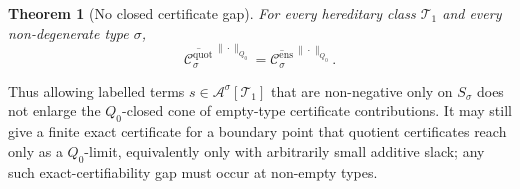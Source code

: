 \documentclass[11pt]{article}
\newtheorem{theorem}{Theorem}
\theoremstyle{definition}
\newcommand{\A}{\mathcal{A}}
\newcommand{\T}{\mathcal{T}}
\newcommand{\C}{\mathcal{C}}
\begin{document}
\begin{theorem}[No closed certificate gap]\label{thm:no-closed-certificate-gap}
For every hereditary class $\T_1$ and every non-degenerate type $\sigma$,
\[
  \overline{\C^{\mathrm{quot}}_\sigma}^{\,\|\cdot\|_{Q_0}}
  =
  \overline{\C^{\mathrm{ens}}_\sigma}^{\,\|\cdot\|_{Q_0}} .
\]
\end{theorem}

Thus allowing labelled terms \(s\in\A^\sigma[\T_1]\) that are non-negative only on
$S_\sigma$ does not enlarge the $Q_0$-closed cone of empty-type certificate
contributions.  It may still give a finite exact certificate for a boundary point that
quotient certificates reach only as a $Q_0$-limit, equivalently only with arbitrarily
small additive slack; any such exact-certifiability gap must occur at non-empty types.
\end{document}
